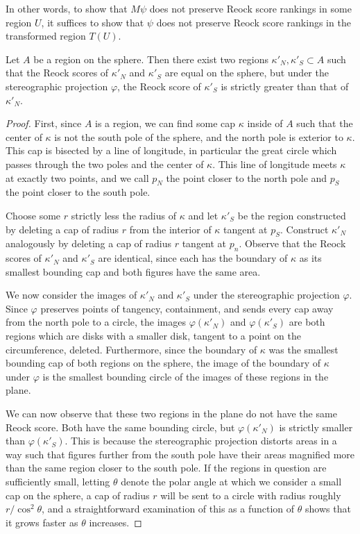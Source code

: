In other words, to show that $M\psi$ 
does not preserve Reock score rankings 
in some region $U$, it suffices to show that 
$\psi$ does not preserve Reock score 
rankings in the transformed region 
$T(U)$.

\begin{theorem}\label{thm:reock}
  Let $A$ be a region on the sphere.  Then there exist two regions
  $\kappa'_N,\kappa'_S\subset A$ such that the Reock scores of
  $\kappa'_N$ and $\kappa'_S$ are equal on the sphere, but under the
  stereographic projection $\varphi$, the Reock score of $\kappa'_S$
  is strictly greater than that of $\kappa'_N$. 
\end{theorem}

\begin{proof}
  First, since $A$ is a region, we can find some cap $\kappa$ inside
  of $A$ such that the center of $\kappa$ is not the south pole of the
  sphere, and the north pole is exterior to $\kappa$.  This cap is
  bisected by a line of longitude, in particular the great circle
  which passes through the two poles and the center of $\kappa$.  This
  line of longitude meets $\kappa$ at exactly two points, and we call
  $p_N$ the point closer to the north pole and $p_S$ the point closer
  to the south pole.

  Choose some $r$ strictly less the radius of $\kappa$ and let
  $\kappa'_S$ be the region constructed by deleting a cap of radius
  $r$ from the interior of $\kappa$ tangent at $p_S$.  Construct
  $\kappa'_N$ analogously by deleting a cap of radius $r$ tangent at
  $p_n$. Observe that the Reock scores of $\kappa'_N$ and $\kappa'_S$
  are identical, since each has the boundary of $\kappa$ as its
  smallest bounding cap and both figures have the same area.

  We now consider the images of $\kappa'_N$ and $\kappa'_S$ under the
  stereographic projection $\varphi$.  Since $\varphi$ preserves
  points of tangency, containment, and sends every cap away from the
  north pole to a circle, the images $\varphi(\kappa'_N)$ and
  $\varphi(\kappa'_S)$ are both regions which are disks with a smaller
  disk, tangent to a point on the circumference, deleted.
  Furthermore, since the boundary of $\kappa$ was the smallest
  bounding cap of both regions on the sphere, the image of the
  boundary of $\kappa$ under $\varphi$ is the smallest bounding circle
  of the images of these regions in the plane.

  We can now observe that these two regions in the plane do not have
  the same Reock score.  Both have the same bounding circle, but
  $\varphi(\kappa'_N)$ is strictly smaller than $\varphi(\kappa'_S)$.
  This is because the stereographic projection distorts areas in a way
  such that figures further from the south pole have their areas
  magnified more than the same region closer to the south pole.  If
  the regions in question are sufficiently small, letting $\theta$
  denote the polar angle at which we consider a small cap on the
  sphere, a cap of radius $r$ will be sent to a circle with radius
  roughly $r/\cos^2{\theta}$, and a straightforward
  examination of this as a function of $\theta$ shows that it grows
  faster as $\theta$ increases.


\end{proof}
